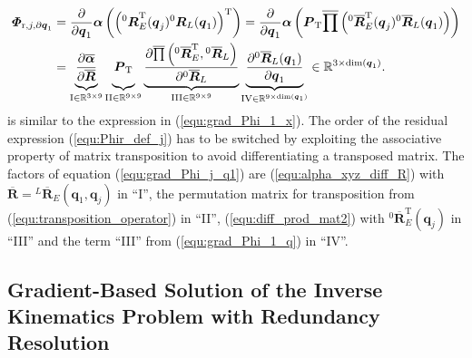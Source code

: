 \documentclass[robotics,article,accept,moreauthors,pdftex]{Definitions/mdpi}
\newcommand{\bm}[1]{\boldsymbol{#1}}
\newcommand{\rotmat}[2]{{{ }^{#1}\boldsymbol{R}}_{#2}}
\newcommand{\rotmato}[2]{{{ }^{#1}\boldsymbol{\overline{R}}}_{#2}}
\newcommand{\transp}[0]{{\mathrm{T}}}
\let\Phi\varPhi
\begin{document}
\begin{align}
\bm{\Phi}_{\mathrm{r},j,\partial\bm{q}_1}
&=
\frac{\partial}{\partial \bm{q}_1} \bm{\alpha}\left(\left(\rotmat{0}{E}^\transp(\bm{q}_j) \rotmat{0}{L}(\bm{q}_1) \right)^\transp \right)
=
\frac{\partial}{\partial \bm{q}_1} \bm{\alpha}\left(\bm{P}_{\mathrm{T}}\overline{\prod}\left( \rotmato{0}{E}^\transp(\bm{q}_j) \rotmato{0}{L}(\bm{q}_1)\right)\right)
\label{equ:grad_Phi_j_q1}\\
&=
\underbrace{
	\vphantom{\frac{\partial \overline{\prod}\left( \rotmato{0}{E}^\transp, \rotmato{0}{D}\right)}{\partial \rotmato{0}{D}}}
	\frac{\partial \overline{\bm{\alpha}}}{\partial \overline{\bm{R}}}
	}_{\mathrm{I} \in {\mathbb{R}}^{3 \times 9}}
\underbrace{
	\vphantom{\frac{\partial \overline{\prod}\left( \rotmato{0}{E}^\transp, \rotmato{0}{D}\right)}{\partial \rotmato{0}{D}}}
	\bm{P}_{\mathrm{T}}
	}_{\mathrm{II} \in {\mathbb{R}}^{9 \times 9}}
\underbrace{
	\frac{\partial \overline{\prod}\left( \rotmato{0}{E}^\transp, \rotmato{0}{L}\right)}{\partial \rotmato{0}{L}}
	}_{\mathrm{III} \in {\mathbb{R}}^{9 \times 9}}
\underbrace{
	\frac{\partial \rotmato{0}{L}(\bm{q}_1)}{\partial \bm{q}_1}
	}_{\mathrm{IV} \in {\mathbb{R}}^{9 \times \mathrm{dim}(\bm{q}_1)}}
\in {\mathbb{R}}^{3 \times \mathrm{dim}(\bm{q}_1)}. \nonumber
\end{align}
%
is similar to the expression in (\ref{equ:grad_Phi_1_x}).
The order of the residual expression (\ref{equ:Phir_def_j}) has to be switched by exploiting the associative property of matrix transposition to avoid differentiating a transposed matrix.
The factors of equation (\ref{equ:grad_Phi_j_q1}) are
(\ref{equ:alpha_xyz_diff_R}) with $\overline{\bm{R}}=\rotmato{L}{E}(\bm{q}_1,\bm{q}_j)$ in ``I'',
the permutation matrix for transposition from (\ref{equ:transposition_operator}) in ``II'',
(\ref{equ:diff_prod_mat2}) with $\rotmato{0}{E}^\transp(\bm{q}_j)$ in ``III'' and
the term ``III'' from (\ref{equ:grad_Phi_1_q}) in ``IV''.

\subsection{Gradient-Based Solution of the Inverse Kinematics Problem with Redundancy Resolution}
\label{sec:ZB_Anwendung_IK_grad}
\end{document}
